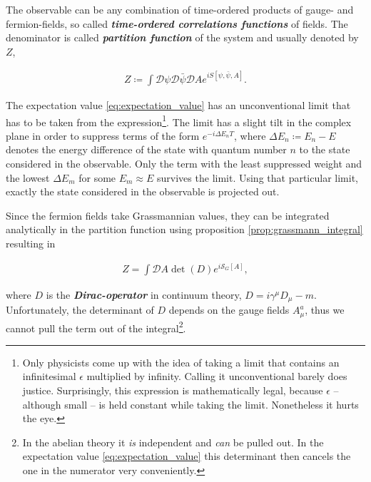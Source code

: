 \documentclass{article}
\theoremstyle{plain} %
\theoremstyle{convention} %
\theoremstyle{remark} %
\def\df#1{\textbf{\textit{#1}}}
\numberwithin{equation}{section}
\begin{document}
The observable can be any combination of time-ordered products of gauge- and fermion-fields, so called \df{time-ordered correlations functions} of fields. The denominator is called \df{partition function} of the system and usually denoted by $Z$,

\begin{align*}
    Z \coloneqq \int \mathcal{D}\psi \mathcal{D} \bar{\psi} \mathcal{D} A e^{iS[\psi, \bar{\psi}, A]}.
\end{align*}

The expectation value \eqref{eq:expectation_value} has an unconventional limit that has to be taken from the expression\footnote{Only physicists come up with the idea of taking a limit that contains an infinitesimal $\epsilon$ multiplied by infinity. Calling it unconventional barely does justice. Surprisingly, this expression is mathematically legal, because $\epsilon$ -- although small -- is held constant while taking the limit. Nonetheless it hurts the eye.}. The limit has a slight tilt in the complex plane in order to suppress terms of the form $e^{-i \Delta E_n T}$, where $\Delta E_n \coloneqq E_n - E$ denotes the energy difference of the state with quantum number $n$ to the state considered in the observable. Only the term with the least suppressed weight and the lowest $\Delta E_m$ for some $E_m \approx E$ survives the limit. Using that particular limit, exactly the state considered in the observable is projected out.

Since the fermion fields take Grassmannian values, they can be integrated analytically in the partition function using proposition \ref{prop:grassmann_integral} resulting in

\begin{align*}
    Z = \int \mathcal{D} A \det(D) e^{i\mathcal{S}_{G}[A]},
\end{align*}

where $D$ is the \df{Dirac-operator} in continuum theory, $D = i\gamma^{\mu} D_{\mu} - m$. Unfortunately, the determinant of $D$ depends on the gauge fields $A_{\mu}^a$, thus we cannot pull the term out of the integral\footnote{In the abelian theory it \textit{is} independent and \textit{can} be pulled out. In the expectation value \eqref{eq:expectation_value} this determinant then cancels the one in the numerator very conveniently.}.

\end{document}
